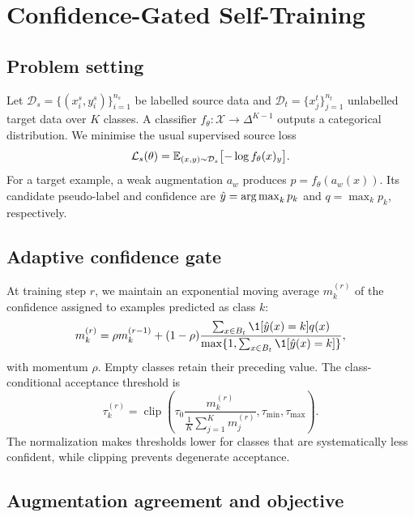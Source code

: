 \section{Confidence-Gated Self-Training}
\label{sec:method}

\subsection{Problem setting}

Let $\mathcal{D}_s=\{(x_i^s,y_i^s)\}_{i=1}^{n_s}$ be labelled source data and
$\mathcal{D}_t=\{x_j^t\}_{j=1}^{n_t}$ unlabelled target data over $K$ classes.
A classifier $f_\theta:\mathcal{X}\rightarrow\Delta^{K-1}$ outputs a categorical
distribution. We minimise the usual supervised source loss
\begin{equation}
  \mathcal{L}_{s}(\theta)
  = \mathbb{E}_{(x,y)\sim\mathcal{D}_s}
    \bigl[-\log f_\theta(x)_y\bigr].
  \label{eq:source}
\end{equation}
For a target example, a weak augmentation $a_w$ produces
$p=f_\theta(a_w(x))$. Its candidate pseudo-label and confidence are
$\hat y=\operatorname*{arg\,max}_k p_k$ and $q=\max_k p_k$, respectively.

\subsection{Adaptive confidence gate}

At training step $r$, we maintain an exponential moving average $m_k^{(r)}$ of
the confidence assigned to examples predicted as class $k$:
\begin{equation}
  m_k^{(r)}=\rho m_k^{(r-1)}+(1-\rho)
  \frac{\sum_{x\in B_t}\1[\hat y(x)=k]q(x)}
       {\max\{1,\sum_{x\in B_t}\1[\hat y(x)=k]\}},
  \label{eq:ema}
\end{equation}
with momentum $\rho$. Empty classes retain their preceding value. The
class-conditional acceptance threshold is
\begin{equation}
  \tau_k^{(r)}=\operatorname{clip}
  \left(\tau_0\frac{m_k^{(r)}}{\frac{1}{K}\sum_{j=1}^{K}m_j^{(r)}},
  \tau_{\min},\tau_{\max}\right).
  \label{eq:threshold}
\end{equation}
The normalization makes thresholds lower for classes that are systematically
less confident, while clipping prevents degenerate acceptance.

\subsection{Augmentation agreement and objective}

